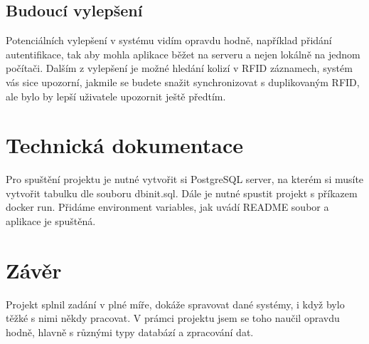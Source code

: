 \documentclass[11pt,a4paper,twoside,openright]{report}
\begin{document}
\section{Budoucí vylepšení}
Potenciálních vylepšení v systému vidím opravdu hodně, například přidání autentifikace, tak aby mohla aplikace běžet na serveru a nejen lokálně na jednom počítači. Dalším z vylepšení je možné hledání kolizí v RFID záznamech, systém vás sice upozorní, jakmile se budete snažit synchronizovat s duplikovaným RFID, ale bylo by lepší uživatele upozornit ještě předtím.  

\chapter{Technická dokumentace}

Pro spuštění projektu je nutné vytvořit si PostgreSQL server, na kterém si musíte vytvořit tabulku dle souboru dbinit.sql. Dále je nutné spustit projekt s příkazem docker run. Přidáme environment variables, jak uvádí README soubor a aplikace je spuštěná.

\chapter*{Závěr}
\pagestyle{empty}

Projekt splnil zadání v plné míře, dokáže spravovat dané systémy, i když bylo těžké s nimi někdy pracovat. V prámci projektu jsem se toho naučil opravdu hodně, hlavně s různými typy databází a zpracování dat.

\nocite{timcorey}\nocite{npgsql}
\printbibliography[title={Seznam použité literatury},heading={bibintoc}]


\end{document}
